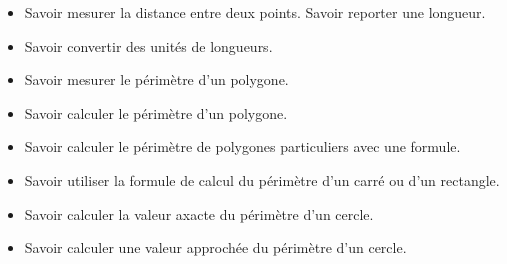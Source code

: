 \documentclass[a4paper,dvipsnames]{article}
\begin{document}
\begin{CpsCol}
\begin{itemize}
\item Savoir mesurer la distance entre deux points.
Savoir reporter une longueur.
\item Savoir convertir des unités de longueurs.
\item Savoir mesurer le périmètre d'un polygone.
\item Savoir calculer le périmètre d'un polygone.
\item Savoir calculer le périmètre de polygones particuliers avec une formule.
\item Savoir utiliser la formule de calcul du périmètre d'un carré ou d'un rectangle.
\item Savoir calculer la valeur axacte du périmètre d'un cercle.
\item Savoir calculer une valeur approchée du périmètre d'un cercle.
\end{itemize}
\end{CpsCol}
\end{document}
